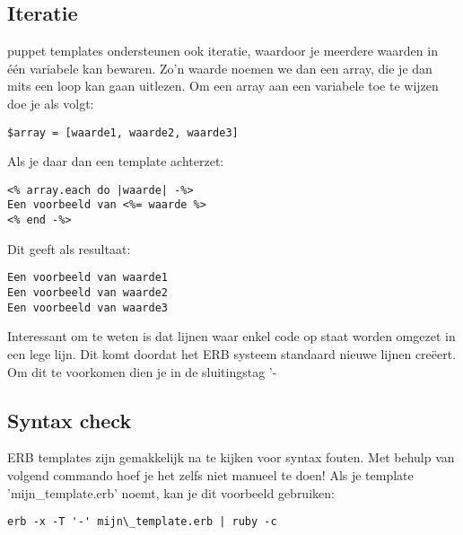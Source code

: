 \subsection{Iteratie}
puppet templates ondersteunen ook iteratie, waardoor je meerdere waarden in \'{e}\'{e}n variabele kan bewaren. Zo'n waarde noemen we dan een array, die je dan mits een loop kan gaan uitlezen. Om een array aan een variabele toe te wijzen doe je als volgt:
%
\begin{code}
\begin{lstlisting}
$array = [waarde1, waarde2, waarde3]
\end{lstlisting}
\end{code}
%
Als je daar dan een template achterzet:
%
\begin{code}
\begin{lstlisting}
<% array.each do |waarde| -%>
Een voorbeeld van <%= waarde %>
<% end -%>
\end{lstlisting}
\end{code}
%
Dit geeft als resultaat:
%
\begin{code}
\begin{lstlisting}
Een voorbeeld van waarde1
Een voorbeeld van waarde2
Een voorbeeld van waarde3
\end{lstlisting}
\end{code}
%
Interessant om te weten is dat lijnen waar enkel code op staat worden omgezet in een lege lijn. Dit komt doordat het ERB systeem standaard nieuwe lijnen cre\"{e}ert. Om dit te voorkomen dien je in de sluitingstag '-%
%
\subsection{Syntax check}
ERB templates zijn gemakkelijk na te kijken voor syntax fouten. Met behulp van volgend commando hoef je het zelfs niet manueel te doen! Als je template 'mijn\_template.erb' noemt, kan je dit voorbeeld gebruiken:
%
\begin{code}
\begin{lstlisting}
erb -x -T '-' mijn\_template.erb | ruby -c
\end{lstlisting}
\end{code}
